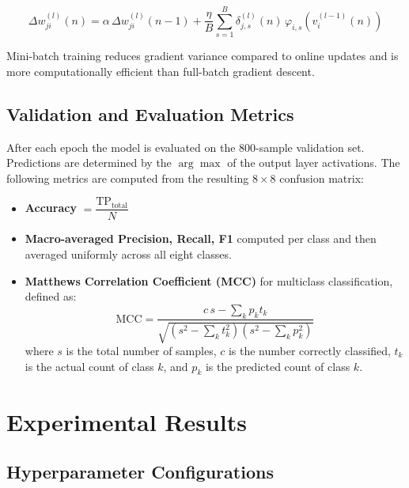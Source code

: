 \documentclass{acm_proc_article-sp}
\begin{document}
\begin{equation}
  \Delta w^{(l)}_{ji}(n)
  = \alpha\,\Delta w^{(l)}_{ji}(n-1)
  + \frac{\eta}{B}\sum_{s=1}^{B}
    \delta^{(l)}_{j,s}(n)\,\varphi_{i,s}\!\left(v^{(l-1)}_i(n)\right)
\end{equation}

Mini-batch training reduces gradient variance compared to online updates
and is more computationally efficient than full-batch gradient descent.

\subsection{Validation and Evaluation Metrics}

After each epoch the model is evaluated on the 800-sample validation
set.  Predictions are determined by the $\arg\max$ of the output
layer activations.  The following metrics are computed from the
resulting $8\times 8$ confusion matrix:

\begin{itemize}
  \item \textbf{Accuracy} $= \dfrac{\text{TP}_\text{total}}{N}$
  \item \textbf{Macro-averaged Precision, Recall, F1} computed
        per class and then averaged uniformly across all eight classes.
  \item \textbf{Matthews Correlation Coefficient (MCC)} for
        multiclass classification, defined as:
        \begin{equation}
          \text{MCC} =
          \frac{c\,s - \textstyle\sum_k p_k t_k}
               {\sqrt{\left(s^2 - \textstyle\sum_k t_k^2\right)
                      \left(s^2 - \textstyle\sum_k p_k^2\right)}}
        \end{equation}
        where $s$ is the total number of samples, $c$ is the number
        correctly classified, $t_k$ is the actual count of class $k$,
        and $p_k$ is the predicted count of class $k$.
\end{itemize}

\section{Experimental Results}

\subsection{Hyperparameter Configurations}
\end{document}
